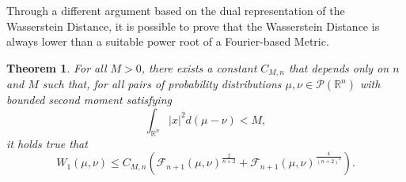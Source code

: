 \documentclass{article}
\renewcommand{\le}{\leqslant}
\def \PP{\mathcal{P}}
\def \erre{\mathbb{R}}
\newtheorem{theorem}{Theorem}
\begin{document}
% 
Through a different argument based on the dual representation of the Wasserstein Distance, it is possible to prove that the Wasserstein Distance is always lower than a suitable power root of a Fourier-based Metric.
% 


\begin{theorem}
    For all $M>0$, there exists a constant $C_{M,n}$ that depends only on $n$ and $M$ such that, for all pairs of probability distributions $\mu,\nu\in\PP(\erre^n)$ with bounded second moment satisfying
    \[
        \int_{\erre^n}|x|^2d(\mu-\nu)<M,
    \]
    it holds true that
    \begin{equation}
        W_1(\mu,\nu)\le C_{M,n} \left( \mathcal{F}_{n+1}(\mu,\nu)^{\frac{2}{n+2}} + \mathcal{F}_{n+1}(\mu,\nu)^{\frac{4}{(n+2)^2} }\right).
    \end{equation}
\end{theorem}
\end{document}

